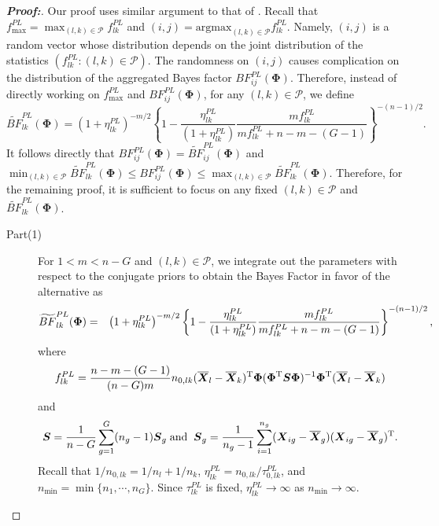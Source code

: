 \documentclass[times,sort&compress,3p]{elsarticle}
\theoremstyle{plain}%
\theoremstyle{definition}
\def\bse{\begin{eqnarray*}}
\def\ese{\end{eqnarray*}}
\def\be{\begin{eqnarray}}
\def\ee{\end{eqnarray}}
\def\trans{^{\rm T}}
\newcommand{\uS}       {\mbox{\boldmath$S$}}
\newcommand{\uX}       {\mbox{\boldmath$X$}}
\newcommand{\uPhi}              {\mbox{\boldmath$\Phi$}}
\begin{document}
\begin{proof}[\textbf{\upshape Proof:}]
Our proof uses similar argument to that of \cite{zoh2018powerful}. 
Recall that $f_{\max}^{PL} = \max_{(l, k) \in\mathcal{P}}f_{lk}^{PL}$ and $(i, j) = \mathrm{argmax}_{(l, k)\in\mathcal{P}}f_{lk}^{PL}$. Namely, $(i, j)$ is a random vector whose distribution depends on the joint distribution of the statistics $(f_{lk}^{PL}:(l, k)\in\mathcal{P})$. The randomness on $(i, j)$ causes complication on the distribution of the aggregated Bayes factor $BF_{ij}^{PL}(\mathbf{\Phi})$. 
Therefore, instead of directly working on $f_{\max}^{PL}$ and $BF_{ij}^{PL}(\mathbf{\Phi})$, for any $(l, k)\in\mathcal{P}$, we define 
\[
\widetilde{BF}_{lk}^{PL}(\mathbf{\Phi}) = \left(1 + \eta^{PL}_{lk} \right)^{-m/2} \left\{ 1 - \frac{\eta^{PL}_{lk}}{(1 + \eta^{PL}_{lk})}\frac{ m f_{lk}^{PL}}{ m f_{lk}^{PL}  + n - m - (G-1)} \right\}^{-(n-1)/2}.
\]
It follows directly that $BF_{ij}^{PL}(\mathbf{\Phi}) = \widetilde{BF}_{ij}^{PL}(\mathbf{\Phi})$ and $\min_{(l,k)\in\mathcal{P}}\widetilde{BF}_{lk}^{PL}(\mathbf{\Phi})\leq BF_{ij}^{PL}(\mathbf{\Phi})\leq \max_{(l,k)\in\mathcal{P}}\widetilde{BF}_{lk}^{PL}(\mathbf{\Phi})$. Therefore, for the remaining proof, it is sufficient to focus on any fixed $(l, k)\in\mathcal{P}$ and $\widetilde{BF}_{lk}^{PL}(\mathbf{\Phi})$. 
\begin{description}
\item[Part(1)]
For $1 < m < n - G$ and 
$(l, k)\in\mathcal{P}$,
we integrate out the parameters with respect to the conjugate priors to obtain the Bayes Factor in favor of the alternative as
\be
\widetilde{BF}^{PL}_{lk}(\uPhi) &=&
\left(1 + \eta^{PL}_{lk} \right)^{-m/2} \left\{ 1 - \frac{\eta^{PL}_{lk}}{(1 + \eta^{PL}_{lk})}\frac{ m f_{lk}^{PL}}{ m f_{lk}^{PL}  + n - m - (G-1)} \right\}^{-(n-1)/2} 
\nonumber,
\ee
where
\bse
f_{lk}^{PL}  = \frac{n - m - (G-1)}{(n-G)m} n_{0,lk}(\overline{\uX}_l - \overline{\uX}_k)\trans \uPhi(\uPhi\trans \uS\uPhi )^{-1}\uPhi\trans (\overline{\uX}_l - \overline{\uX}_k)
\ese
and $$ \uS = \frac{1}{n - G} \sum^{G}_{g=1}(n_g -1)\uS_{g}\; \text{and} \;\; \uS_g = \frac{1}{n_g - 1}\sum^{n_g}_{i=1}(\uX_{ig} - \overline{\uX}_{g})(\uX_{ig} - \overline{\uX}_{g})\trans.$$
Recall that $1/n_{0,lk} = 1/n_l + 1/n_k$, $\eta^{PL}_{lk} = n_{0,lk}/\tau^{PL}_{0,lk}$, and $n_{\min} = \min\{n_1, \cdots, n_G\}$.
Since $\tau^{PL}_{lk}$ is fixed, $\eta^{PL}_{lk} \rightarrow \infty$ as $n_{\min} \to \infty$.

\end{description}
\end{proof}
\end{document}
